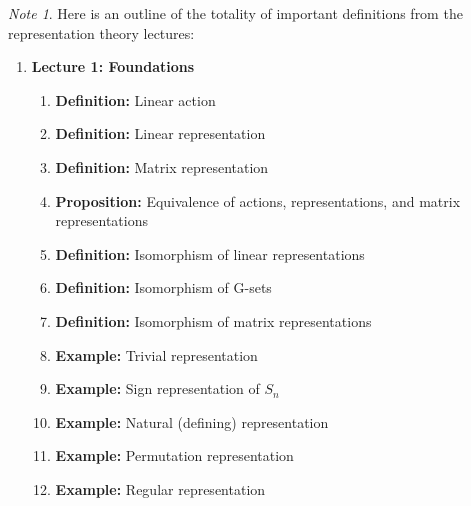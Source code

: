 \documentclass[titlepage]{article}
\theoremstyle{plain}
\theoremstyle{definition}
\theoremstyle{remark}
\newtheorem{note}{Note}
\theoremstyle{exercise-style}
\numberwithin{equation}{section}
\numberwithin{theorem}{section}
\numberwithin{remark}{section}
\begin{document}
\begin{myboxr}
    \begin{note}
        Here is an outline of the totality of important definitions from the representation theory lectures:
        \begin{enumerate}
            
            \item \textbf{Lecture 1: Foundations}
            \begin{enumerate}
                \item \textbf{Definition:} Linear action
                \item \textbf{Definition:} Linear representation
                \item \textbf{Definition:} Matrix representation
                \item \textbf{Proposition:} Equivalence of actions, representations, and matrix representations
                \item \textbf{Definition:} Isomorphism of linear representations 
                \item 
                \textbf{Definition:} Isomorphism of G-sets 
                \item 
                \textbf{Definition:} Isomorphism of matrix representations
                \item \textbf{Example:} Trivial representation
                \item \textbf{Example:} Sign representation of $S_n$
                \item \textbf{Example:} Natural (defining) representation
                \item \textbf{Example:} Permutation representation
                \item \textbf{Example:} Regular representation
            \end{enumerate}
            

\end{enumerate}
\end{note}
\end{myboxr}
\end{document}
